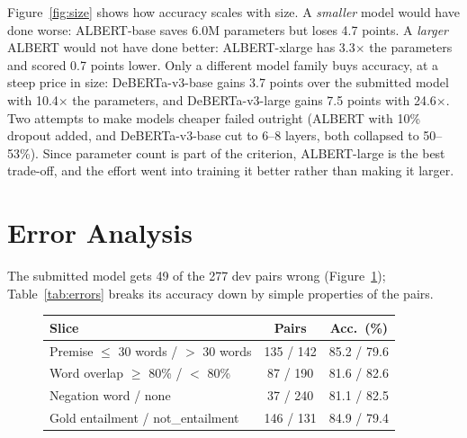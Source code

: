 \documentclass[11pt]{article}
\begin{document}
Figure~\ref{fig:size} shows how accuracy scales with size. A \emph{smaller} model would have done worse: ALBERT-base
saves 6.0M parameters but loses 4.7 points. A \emph{larger} ALBERT would not have done better: ALBERT-xlarge has
3.3$\times$ the parameters and scored 0.7 points lower. Only a different model family buys accuracy, at a steep
price in size: DeBERTa-v3-base gains 3.7 points over the submitted model with 10.4$\times$ the parameters, and DeBERTa-v3-large
gains 7.5 points with 24.6$\times$. Two attempts to make models cheaper failed outright (ALBERT with 10\% dropout
added, and DeBERTa-v3-base cut to 6--8 layers, both collapsed to 50--53\%). Since parameter count is part of the
criterion, ALBERT-large is the best trade-off, and the effort went into training it better rather than making it larger.

\section{Error Analysis}

The submitted model gets 49 of the 277 dev pairs wrong (Figure~\ref{fig:cm}); Table~\ref{tab:errors} breaks its
accuracy down by simple properties of the pairs.

\begin{figure}[h]
\centering
\begin{minipage}[c]{0.6\linewidth}
\centering\small
{}
\label{tab:errors}
\begin{tabular}{lcc}
\toprule
Slice & Pairs & Acc.\ (\%) \\
\midrule
Premise $\le$ 30 words / $>$ 30 words & 135 / 142 & 85.2 / 79.6 \\
Word overlap $\ge$ 80\% / $<$ 80\%   & 87 / 190  & 81.6 / 82.6 \\
Negation word / none                 & 37 / 240  & 81.1 / 82.5 \\
Gold entailment / not\_entailment    & 146 / 131 & 84.9 / 79.4 \\
\bottomrule
\end{tabular}
\end{minipage}\hfill
\begin{minipage}[c]{0.37\linewidth}
\centering
{}
\label{fig:cm}
\end{minipage}
\end{figure}
\end{document}
